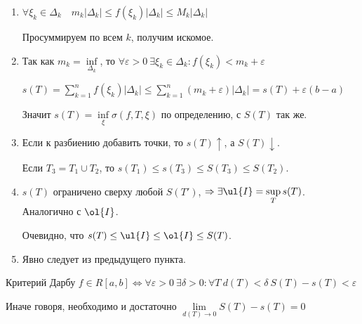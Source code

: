 \begin{enumerate}
    \item
        \(
            \forall \xi_k \in \Delta_k
            \quad
            m_k | \Delta_k | \leq f(\xi_k) | \Delta_k | \leq M_k | \Delta_k |
        \)

        Просуммируем по всем \( k \), получим искомое.
    \item
        Так как \( m_k = \inf\limits_{\Delta_k} \), то
        \( \forall \varepsilon > 0 \ \exists \xi_k \in \Delta_k : f(\xi_k) < m_k + \varepsilon \)

        \(
            s(T) = \sum\limits_{k = 1}^{n} f(\xi_k) | \Delta_k |
            \leq
            \sum\limits_{k = 1}^{n} (m_k + \varepsilon) | \Delta_k |
            =
            s(T) + \varepsilon (b - a)
        \)

        Значит \( s(T) = \inf\limits_{\xi} \sigma(f, T, \xi) \) по определению, с \( S(T) \) так же.
    \item
        Если к разбиению добавить точки, то \( s(T) \uparrow \), а \( S(T) \downarrow \).

        Если \( T_3 = T_1 \cup T_2 \), то \( s(T_1) \leq s(T_3) \leq S(T_3) \leq S(T_2) \).
    \item
        \( s(T) \) ограничено сверху любой \( S(T') \),
        \( \Rightarrow \exists \ul{I} = \sup\limits_T s(T) \).
        Аналогично с \( \ol{I} \).

        Очевидно, что \( s(T) \leq \ul{I} \leq \ol{I} \leq S(T) \).
    \item
        Явно следует из предыдущего пункта.
\end{enumerate}

\begin{thrm}{Критерий Дарбу}{}
    \(
        f \in R[a, b]
        \Leftrightarrow
        \forall \varepsilon > 0 \ \exists \delta > 0 : \forall T \ d(T) < \delta \ S(T) - s(T) < \varepsilon
    \)

    Иначе говоря, необходимо и достаточно \( \lim\limits_{d(T) \to 0} S(T) - s(T) = 0 \)
\end{thrm}

